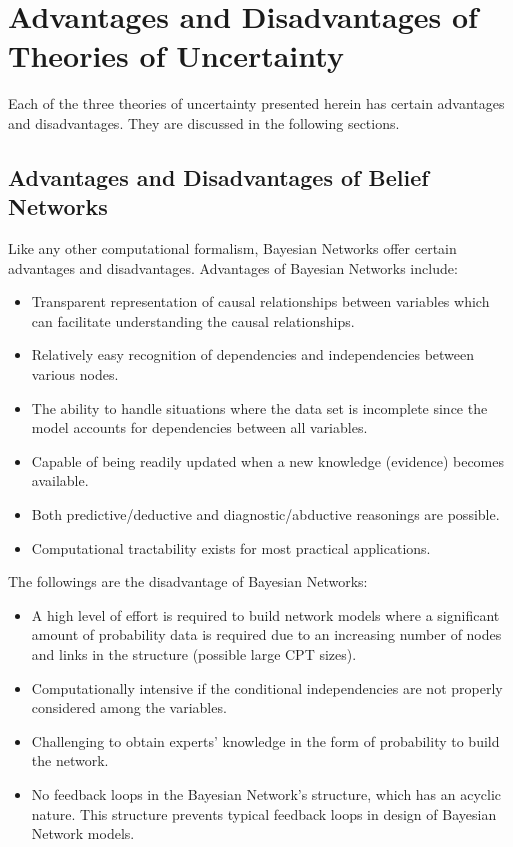 \documentclass[11pt]{article}
\begin{document}
\section{Advantages and Disadvantages of Theories of Uncertainty}
\label{sec:pros-cons}

Each of the three theories of uncertainty presented herein has certain
advantages and disadvantages. They are discussed in the following sections.

\subsection{Advantages and Disadvantages of Belief Networks}

Like any other computational formalism, Bayesian Networks offer certain
advantages and disadvantages. Advantages of Bayesian Networks include:

\begin{itemize}
  \item Transparent representation of causal relationships between variables
  which can facilitate understanding the causal relationships.
  
  \item Relatively easy recognition of dependencies and independencies between
  various nodes.
  
  \item The ability to handle situations where the data set is incomplete since
  the model accounts for dependencies between all variables.
  
  \item Capable of being readily updated when a new knowledge (evidence) becomes
  available.
  
  \item Both predictive/deductive and diagnostic/abductive reasonings are
  possible.

  \item Computational tractability exists for most practical applications.
\end{itemize}

\noindent The followings are the disadvantage of Bayesian Networks:

\begin{itemize}
  \item A high level of effort is required to build network models where a
  significant amount of probability data is required due to an increasing number
  of nodes and links in the structure (possible large CPT sizes).
  
  \item Computationally intensive if the conditional independencies are not
  properly considered among the variables.
  
  \item Challenging to obtain experts' knowledge in the form of probability to
  build the network.
  
  \item No feedback loops in the Bayesian Network's structure, which has an
  acyclic nature. This structure prevents typical feedback loops in design of
  Bayesian Network models.
\end{itemize}
\end{document}
